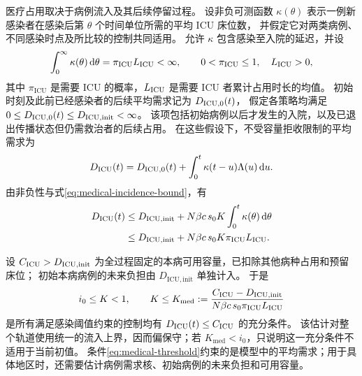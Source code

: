 \documentclass[11pt,a4paper,UTF8]{ctexart}
\theoremstyle{definition}
\newcommand{\dd}{\,\mathrm d}
\begin{document}
医疗占用取决于病例流入及其后续停留过程\citep{Baas2021Occupancy}。
设非负可测函数 $\kappa(\theta)$ 表示一例新感染者在感染后第 $\theta$ 个时间单位所需的平均 ICU 床位数，
并假定它对两类病例、不同感染时点及所比较的控制共同适用。
允许 $\kappa$ 包含感染至入院的延迟，并设
\begin{equation}
\int_0^\infty\kappa(\theta)\dd \theta=\pi_{\mathrm{ICU}}L_{\rm ICU}<\infty,
\qquad 0<\pi_{\mathrm{ICU}}\le1,\quad L_{\rm ICU}>0,
\label{eq:medical-demand-kernel}
\end{equation}
其中 $\pi_{\mathrm{ICU}}$ 是需要 ICU 的概率，$L_{\rm ICU}$ 是需要 ICU 者累计占用时长的均值。
初始时刻及此前已经感染者的后续平均需求记为 $D_{{\rm ICU},0}(t)$，
假定各策略均满足 $0\le D_{{\rm ICU},0}(t)\le D_{\mathrm{ICU,init}}<\infty$。
该项包括初始病例以后才发生的入院，以及已退出传播状态但仍需救治者的后续占用。
在这些假设下，不受容量拒收限制的平均需求为
\begin{equation}
D_{\rm ICU}(t)=D_{{\rm ICU},0}(t)+\int_0^t\kappa(t-u)\Lambda(u)\dd u.
\label{eq:medical-demand}
\end{equation}
由非负性与式\eqref{eq:medical-incidence-bound}，有
\begin{equation}
\begin{aligned}
D_{\rm ICU}(t)&\le D_{\mathrm{ICU,init}}+N\beta c\,s_0K\int_0^t\kappa(\theta)\dd \theta\\
&\le D_{\mathrm{ICU,init}}+N\beta c\,s_0K\pi_{\mathrm{ICU}}L_{\rm ICU}.
\end{aligned}
\label{eq:medical-demand-bound}
\end{equation}

设 $C_{\rm ICU}>D_{\mathrm{ICU,init}}$ 为全过程固定的本病可用容量，已扣除其他病种占用和预留床位；
初始本病病例的未来负担由 $D_{\mathrm{ICU,init}}$ 单独计入。
于是
\begin{equation}
i_0\le K<1,\qquad
K\le K_{\mathrm{med}}:=
\frac{C_{\rm ICU}-D_{\mathrm{ICU,init}}}{N\beta c\,s_0\pi_{\mathrm{ICU}}L_{\rm ICU}}
\label{eq:medical-threshold}
\end{equation}
是所有满足感染阈值约束的控制均有 $D_{\rm ICU}(t)\le C_{\rm ICU}$ 的充分条件。
该估计对整个轨道使用统一的流入上界，因而偏保守；若 $K_{\mathrm{med}}<i_0$，只说明这一充分条件不适用于当前初值。
条件\eqref{eq:medical-threshold}约束的是模型中的平均需求；用于具体地区时，还需要估计病例需求核、初始病例的未来负担和可用容量。




\end{document}
